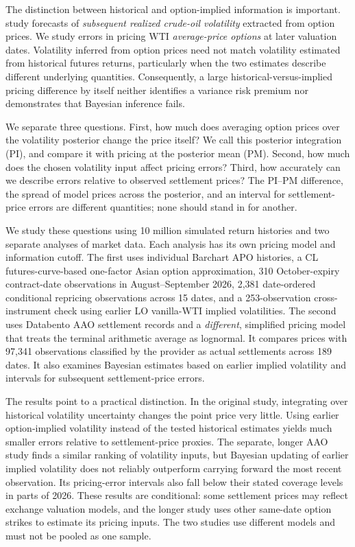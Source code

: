 The distinction between historical and option-implied information
is important. \citet{gildertsiaras2020} study forecasts of
\emph{subsequent realized crude-oil volatility} extracted from
option prices. We study errors in pricing WTI
\emph{average-price options} at later valuation dates. Volatility inferred from option prices need not match
volatility estimated from historical futures returns,
particularly when the two estimates describe different
underlying quantities. Consequently, a large historical-versus-implied
pricing difference by itself neither identifies a variance
risk premium nor demonstrates that Bayesian inference fails.

We separate three questions. First, how much does averaging
option prices over the volatility posterior change the price itself?
We call this posterior integration (PI), and compare it with pricing
at the posterior mean (PM). Second, how much does the chosen
volatility input affect pricing errors? Third, how accurately can
we describe errors relative to observed settlement prices?
The PI--PM difference, the spread of model prices across
the posterior, and an interval for settlement-price errors
are different quantities; none should stand in for another.

We study these questions using 10 million simulated return
histories and two separate analyses of market data. Each
analysis has its own pricing model and information cutoff. The first uses individual Barchart
APO histories, a CL futures-curve-based one-factor
Asian option approximation, 310 October-expiry
contract-date observations in August--September 2026,
2,381 date-ordered conditional repricing observations across 15 dates,
and a 253-observation cross-instrument check using
earlier LO vanilla-WTI implied volatilities. The second
uses Databento AAO settlement records and a \emph{different},
simplified pricing model that treats the terminal arithmetic
average as lognormal. It compares prices with 97,341
observations classified by the provider as actual settlements
across 189 dates. It also examines Bayesian estimates based on
earlier implied volatility and intervals for subsequent
settlement-price errors.

The results point to a practical distinction. In the original
study, integrating over historical volatility uncertainty changes
the point price very little. Using earlier option-implied
volatility instead of the tested historical estimates yields
much smaller errors relative to settlement-price proxies.
The separate, longer AAO study finds a similar ranking of
volatility inputs, but Bayesian updating of earlier implied
volatility does not reliably outperform carrying forward
the most recent observation. Its pricing-error intervals also fall below their stated
coverage levels in parts of 2026. These results are conditional:
some settlement prices may reflect exchange valuation models,
and the longer study uses other same-date option strikes to
estimate its pricing inputs. The two studies use different
models and must not be pooled as one sample.

